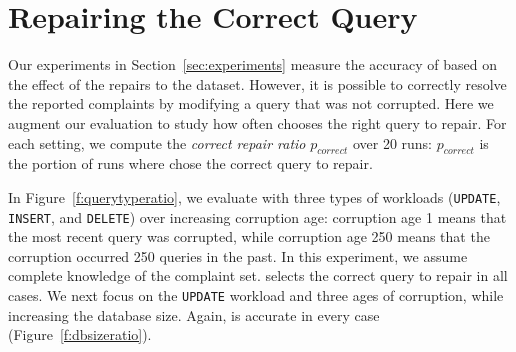 \section{Repairing the Correct Query}
\label{app:index}


Our experiments in Section~\ref{sec:experiments} measure the accuracy of \sys
based on the effect of the repairs to the dataset. However, it is possible to
correctly resolve the reported complaints by modifying a query that was not
corrupted. Here we augment our evaluation to study how often \sys chooses the
right query to repair.  For each setting, we compute the \emph{correct repair
ratio} $p_{correct}$ over 20 runs: $p_{correct}$ is the portion of runs where \sys
chose the correct query to repair.

In Figure~\ref{f:querytyperatio}, we evaluate \qfix with three types of
workloads (\texttt{UPDATE}, \texttt{INSERT}, and \texttt{DELETE}) over
increasing corruption age: corruption age 1 means that the most recent query
was corrupted, while corruption age 250 means that the corruption occurred 250
queries in the past. In this experiment, we assume complete knowledge of the
complaint set. \sys selects the correct query to repair in all cases. We next
focus on the \texttt{UPDATE} workload and three ages of corruption, while
increasing the database size. Again, \sys is accurate in every case
(Figure~\ref{f:dbsizeratio}).


